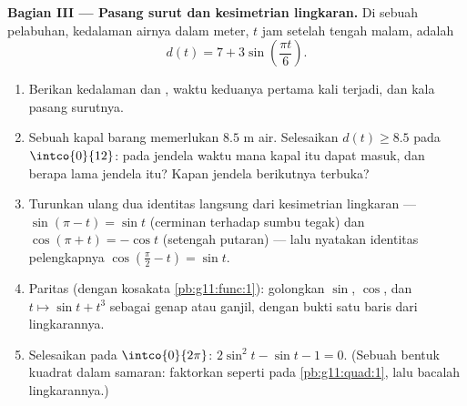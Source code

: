 \begin{problem}
\medskip
\noindent\textbf{Bagian III --- Pasang surut dan kesimetrian
lingkaran.}
Di sebuah pelabuhan, kedalaman airnya dalam meter, $t$ jam setelah
tengah malam, adalah
\[
d(t) = 7 + 3 \sin\!\left(\frac{\pi t}{6}\right).
\]
\begin{enumerate}[resume]
  \item Berikan kedalaman  dan , waktu keduanya
        pertama kali terjadi, dan kala pasang surutnya.
  \item Sebuah kapal barang memerlukan $8.5$ m air. Selesaikan
        $d(t) \geq 8.5$ pada $\intco{0}{12}$: pada jendela waktu mana
        kapal itu dapat masuk, dan berapa lama jendela itu? Kapan
        jendela berikutnya terbuka?
  \item Turunkan ulang dua identitas  langsung dari
        kesimetrian lingkaran --- $\sin(\pi - t) = \sin t$ (cerminan
        terhadap sumbu tegak) dan $\cos(\pi + t) = -\cos t$
        (setengah putaran) --- lalu nyatakan identitas pelengkapnya
        $\cos\left(\frac\pi2 - t\right) = \sin t$.
  \item Paritas (dengan kosakata \cref{pb:g11:func:1}): golongkan
        $\sin$, $\cos$, dan $t \mapsto \sin t + t^3$ sebagai genap atau
        ganjil, dengan bukti satu baris dari lingkarannya.
  \item Selesaikan pada $\intco{0}{2\pi}$:
        $2\sin^2 t - \sin t - 1 = 0$. (Sebuah bentuk kuadrat dalam
        samaran: faktorkan seperti pada \cref{pb:g11:quad:1}, lalu
        bacalah lingkarannya.)
\end{enumerate}


\end{problem}
